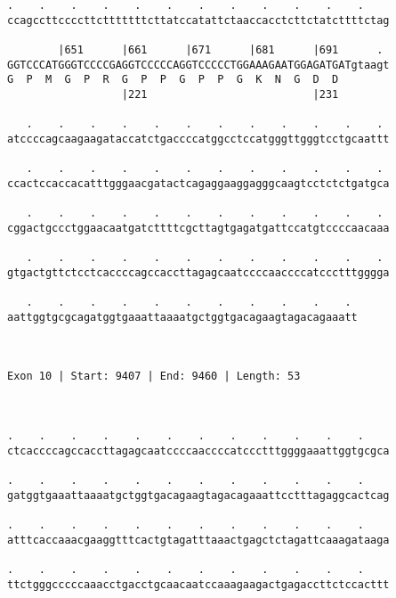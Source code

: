 \documentclass{article}
\begin{document}
\begin{Verbatim}
.    .    .    .    .    .    .    .    .    .    .    .    
ccagccttccccttctttttttcttatccatattctaaccacctcttctatcttttctag
                                                            
        |651      |661      |671      |681      |691      . 
GGTCCCATGGGTCCCCGAGGTCCCCCAGGTCCCCCTGGAAAGAATGGAGATGATgtaagt
G  P  M  G  P  R  G  P  P  G  P  P  G  K  N  G  D  D        
                  |221                          |231        
  
   .    .    .    .    .    .    .    .    .    .    .    . 
atccccagcaagaagataccatctgaccccatggcctccatgggttgggtcctgcaattt
                                                            
   .    .    .    .    .    .    .    .    .    .    .    . 
ccactccaccacatttgggaacgatactcagaggaaggagggcaagtcctctctgatgca
                                                            
   .    .    .    .    .    .    .    .    .    .    .    . 
cggactgccctggaacaatgatcttttcgcttagtgagatgattccatgtccccaacaaa
                                                            
   .    .    .    .    .    .    .    .    .    .    .    . 
gtgactgttctcctcaccccagccaccttagagcaatccccaaccccatccctttgggga
                                                            
   .    .    .    .    .    .    .    .    .    .    . 
aattggtgcgcagatggtgaaattaaaatgctggtgacagaagtagacagaaatt
                                                       
                                                       
 
Exon 10 | Start: 9407 | End: 9460 | Length: 53



.    .    .    .    .    .    .    .    .    .    .    .    
ctcaccccagccaccttagagcaatccccaaccccatccctttggggaaattggtgcgca
                                                            
.    .    .    .    .    .    .    .    .    .    .    .    
gatggtgaaattaaaatgctggtgacagaagtagacagaaattcctttagaggcactcag
                                                            
.    .    .    .    .    .    .    .    .    .    .    .    
atttcaccaaacgaaggtttcactgtagatttaaactgagctctagattcaaagataaga
                                                            
.    .    .    .    .    .    .    .    .    .    .    .    
ttctgggcccccaaacctgacctgcaacaatccaaagaagactgagaccttctccacttt
                                                            

\end{Verbatim}
\end{document}
